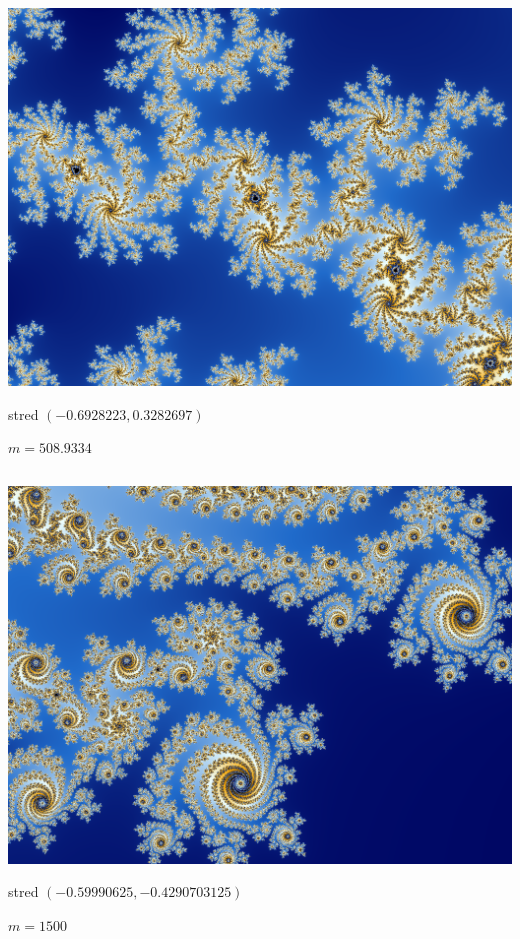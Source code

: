 \begin{column}{0.45}
\vskip 0pt
\centerline{\includegraphics[width=1.1\textwidth]{data/mb1.png}}
\centerline{stred $(-0.6928223,0.3282697)$}
\centerline{$m=508.9334$}
\end{column}
\hfill
\begin{column}{0.45}
\vskip 0pt
\centerline{\includegraphics[width=1.1\textwidth]{data/mb2.png}}
\centerline{stred $(-0.59990625,-0.4290703125)$}
\centerline{$m=1500$}
\end{column}


